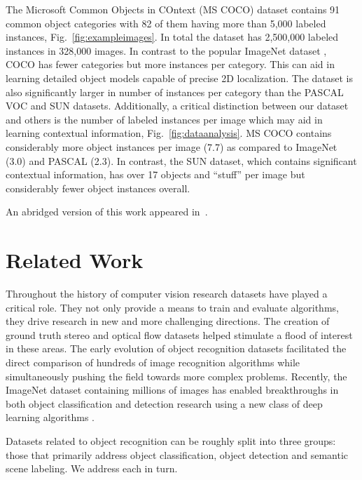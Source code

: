 The Microsoft Common Objects in COntext (MS COCO) dataset contains 91 common object categories with 82 of them having more than 5,000 labeled instances, Fig.~\ref{fig:exampleimages}. In total the dataset has 2,500,000 labeled instances in 328,000 images. In contrast to the popular ImageNet dataset \cite{Imagenet}, COCO has fewer categories but more instances per category. This can aid in learning detailed object models capable of precise 2D localization. The dataset is also significantly larger in number of instances per category than the PASCAL VOC \cite{PASCAL} and SUN \cite{SUN} datasets. Additionally, a critical distinction between our dataset and others is the number of labeled instances per image which may aid in learning contextual information, Fig.~\ref{fig:dataanalysis}. MS COCO contains considerably more object instances per image (7.7) as compared to ImageNet (3.0) and PASCAL (2.3). In contrast, the SUN dataset, which contains significant contextual information, has over 17 objects and ``stuff'' per image but considerably fewer object instances overall.

An abridged version of this work appeared in~\cite{eccv}.

\section{Related Work}

Throughout the history of computer vision research datasets have played a critical role. They not only provide a means to train and evaluate algorithms, they drive research in new and more challenging directions. The creation of ground truth stereo and optical flow datasets \cite{scharstein2002taxonomy,baker2011database} helped stimulate a flood of interest in these areas. The early evolution of object recognition datasets \cite{Caltech101,Caltech256,Dalal} facilitated the direct comparison of hundreds of image recognition algorithms while simultaneously pushing the field towards more complex problems.  Recently, the ImageNet dataset \cite{Imagenet} containing millions of images has enabled breakthroughs in both object classification and detection research using a new class of deep learning algorithms \cite{Hinton,GirshickDDM13,OverFeat}.

Datasets related to object recognition can be roughly split into three groups: those that primarily address object classification, object detection and semantic scene labeling. We address each in turn.

